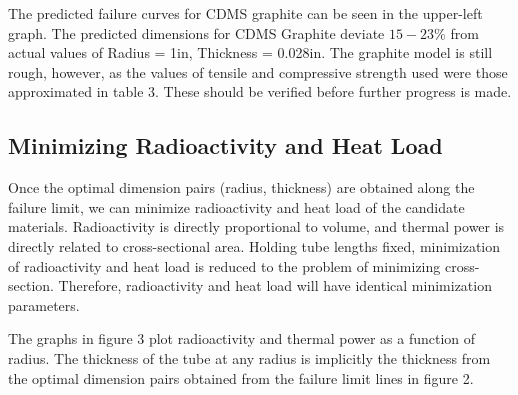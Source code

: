 \documentclass{report}
\begin{document}
\begin{multicols}{2}

The predicted failure curves for CDMS graphite can be seen in the upper-left graph. The predicted dimensions for CDMS Graphite deviate $15-23\%$ from actual values of Radius = 1in, Thickness = 0.028in. The graphite model is still rough, however, as the values of tensile and compressive strength used were those approximated in table 3. These should be verified before further progress is made.

\subsection{Minimizing Radioactivity and Heat Load}

Once the optimal dimension pairs (radius, thickness) are obtained along the failure limit, we can minimize radioactivity and heat load of the candidate materials. Radioactivity is
directly proportional to volume, and thermal power is directly related to cross-sectional area. Holding tube lengths fixed, minimization of radioactivity and heat load is reduced
to the problem of minimizing cross-section. Therefore, radioactivity and heat load will have identical minimization parameters.

The graphs in figure 3 plot radioactivity and thermal power as a function of radius. The thickness of the tube at any radius is implicitly the thickness from the optimal dimension
pairs obtained from the failure limit lines in figure 2.


\end{multicols}
\end{document}
